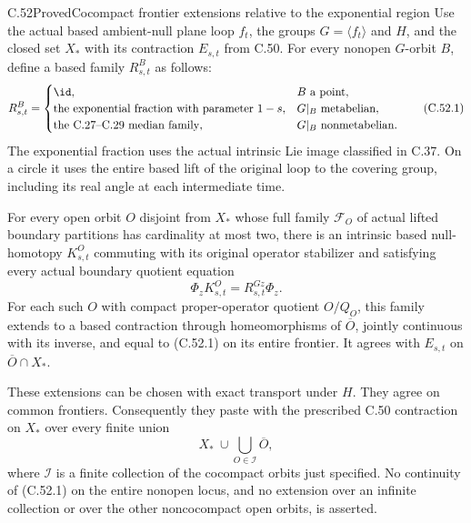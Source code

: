 \begin{claim}{C.52}{Proved}{Cocompact frontier extensions relative to the exponential region}
Use the actual based ambient-null plane loop $f_t$, the groups
$G=\langle f_t\rangle$ and $H$, and the closed set $X_*$ with its
contraction $E_{s,t}$ from C.50.
For every nonopen $G$-orbit $B$, define a based family
$R^B_{s,t}$ as follows:
\[
 R^B_{s,t}=
 \begin{cases}
 \id,&B\text{ a point},\\
 \text{the exponential fraction with parameter }1-s,
       &G|_B\text{ metabelian},\\
 \text{the C.27--C.29 median family},
       &G|_B\text{ nonmetabelian}.
 \end{cases}                                             \tag{C.52.1}
\]
The exponential fraction uses the actual intrinsic Lie image
classified in C.37. On a circle it uses the entire based lift
of the original loop to the covering group, including its
real angle at each intermediate time.

For every open orbit $O$ disjoint from $X_*$ whose full family
$\mathscr F_O$ of actual lifted boundary partitions has
cardinality at most two, there is an intrinsic based
null-homotopy $K^O_{s,t}$ commuting with its original operator
stabilizer and satisfying every actual boundary quotient
equation
\[
                 \Phi_zK^O_{s,t}=R^{Gz}_{s,t}\Phi_z.      \tag{C.52.2}
\]
For each such $O$ with compact proper-operator quotient
$O/Q_O$, this family extends to a based contraction through
homeomorphisms of $\overline O$, jointly continuous with
its inverse, and equal to (C.52.1) on its entire frontier.
It agrees with $E_{s,t}$ on $\overline O\cap X_*$.

These extensions can be chosen with exact transport under
$H$. They agree on common frontiers. Consequently they
paste with the prescribed C.50 contraction on $X_*$ over
every finite union
\[
                  X_*\ \cup\!
                  \bigcup_{O\in\mathcal I}\overline O,    \tag{C.52.3}
\]
where $\mathcal I$ is a finite collection of the
cocompact orbits just specified.
No continuity of (C.52.1) on the entire nonopen locus,
and no extension over an infinite collection or over the
other noncocompact open orbits, is asserted.
\end{claim}

